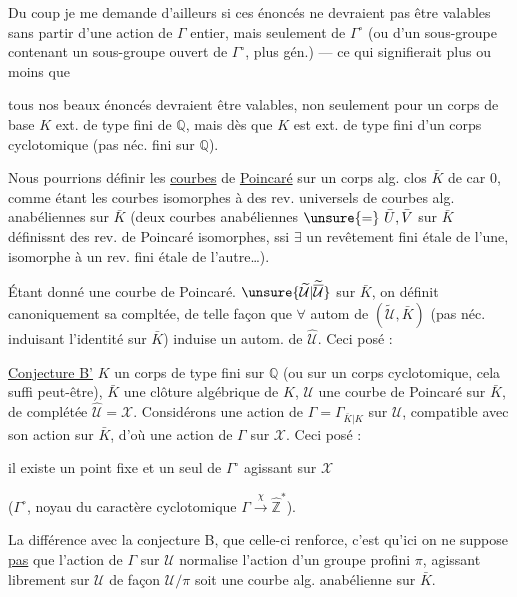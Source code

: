Du coup je me demande d'ailleurs si ces énoncés ne devraient pas être valables sans partir d'une action de $\Gamma$  entier, mais seulement de $\Gamma^\circ$ (ou d'un sous-groupe contenant un sous-groupe ouvert de $\Gamma^\circ$, plus gén.) --- ce qui signifierait plus ou moins que

tous nos beaux énoncés devraient être valables, non seulement pour un corps de base $K$ ext. de type fini de $\mathbb{Q}$, mais dès que $K$ est ext. de type fini d'un corps cyclotomique (pas néc. fini sur $\mathbb{Q}$).

Nous pourrions définir les \uline{courbes} de \uline{Poincaré} sur un corps alg. clos $\bar K$ de car $0$, comme étant les courbes isomorphes à des rev. universels de courbes alg. anabéliennes sur $\bar K$ (deux courbes anabéliennes $\unsure{=}\ \bar U,\bar V$ sur $\bar K$ définissnt des rev. de Poincaré isomorphes, ssi $\exists$ un revêtement fini étale de l'une, isomorphe à un rev. fini étale de l'autre\ldots).

Étant donné une courbe de Poincaré. $\unsure{\widetilde{\mathcal U}|\widetilde{\overline{\mathcal U}}}$ sur $\bar K$,  on définit canoniquement sa compltée, de telle façon que $\forall$ autom de $(\widetilde{\mathcal U},\bar K)$ (pas néc. induisant l'identité sur $\bar K$) induise un autom. de $\widehat{\mathcal U}$.
Ceci posé :

\uline{Conjecture B'}  $K$ un corps de type fini sur $\mathbb{Q}$ (ou sur un corps cyclotomique, cela suffi peut-être), $\bar K$ une clôture algébrique de $K$, $\mathcal U$ une courbe de Poincaré sur $\bar K$, de complétée $\widehat{\mathcal U}=\mathcal X$. Considérons une action de $\Gamma=\Gamma_{\bar K|K}$ sur $\mathcal U$, compatible avec son action sur $\bar K$, d'où une action de $\Gamma$ sur $\mathcal X$. Ceci posé :

il existe un point fixe et un seul de $\Gamma^\circ$ agissant sur $\mathcal X$

($\Gamma^\circ$, noyau du caractère cyclotomique $\Gamma\xrightarrow{\chi}\widehat{\mathbb Z}^{\!*}$).

La différence avec la conjecture B, que celle-ci renforce, c'est qu'ici on ne suppose \uline{pas} que l'action de $\Gamma$ sur $\mathcal U$ normalise l'action d'un groupe profini $\pi$, agissant librement sur $\mathcal U$ de façon  $\mathcal U/\pi$ soit une courbe alg. anabélienne sur $\bar K$.

